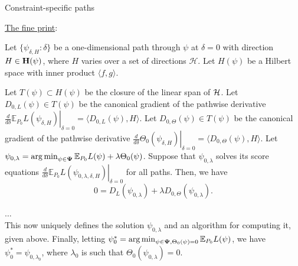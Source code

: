 \documentclass[12pt,t,handout]{beamer}
\newcommand{\E}{\mathbb{E}}
\DeclareMathOperator*{\argmin}{arg\,min}
\begin{document}
\begin{frame}[c]{Constraint-specific paths}

\begin{center}
\underline{The fine print}:

\scriptsize{
\begin{theorem}
Let $\{\psi_{\delta, H}: \delta \}$ be a one-dimensional path through $\psi$ at
$\delta = 0$ with direction $H \in {\bf H}(\psi)$, where $H$ varies over a set
of directions $\mathcal{H}$. Let $H(\psi)$ be a Hilbert space with inner product
$\langle f, g \rangle$.

\vspace{1em}

Let $T(\psi) \subset H(\psi)$ be the closure of the linear span of ${\cal H}$.
Let $D_{0, L}(\psi) \in T(\psi)$ be the canonical gradient of the pathwise
derivative $\left . \frac{d}{d \delta} \E_{P_0}L(\psi_{\delta, H}) \right
|_{\delta = 0} = \langle D_{0, L}(\psi), H \rangle$. Let $D_{0, \Theta}(\psi)
\in T(\psi)$ be the canonical gradient of the pathwise derivative $\left .
 \frac{d}{d \delta}\Theta_0(\psi_{\delta, H}) \right |_{\delta = 0} =
 \langle D_{0, \Theta}(\psi), H \rangle$. Let
$\psi_{0, \lambda} = \argmin_{\psi \in {\bf \Psi}} \E_{P_0}L(\psi) + \lambda
\Theta_0(\psi)$. Suppose that $\psi_{0, \lambda}$ solves its score equations
$\left . \frac{d}{d \delta} \E_{P_0}L(\psi_{0, \lambda, \delta, H}) \right
|_{\delta = 0}$ for all paths. Then, we have
\begin{equation}\label{lfmpathconditiona}
0 = D_L(\psi_{0, \lambda}) + \lambda D_{0, \Theta}(\psi_{0, \lambda}).
\end{equation}

$\dots$\\

This now uniquely defines the solution $\psi_{0, \lambda}$ and an algorithm for
computing it, given above. Finally, letting $\psi_0^* = \argmin_{\psi \in {\bf
\Psi}, \Theta_0(\psi) = 0} \E_{P_0}L(\psi)$, we have $\psi_0^* = \psi_{0,
 \lambda_0}$, where $\lambda_0$ is such that $\Theta_0(\psi_{0, \lambda}) = 0$.
\end{theorem}
}

\end{center}

\note{
}

\end{frame}

\end{document}
